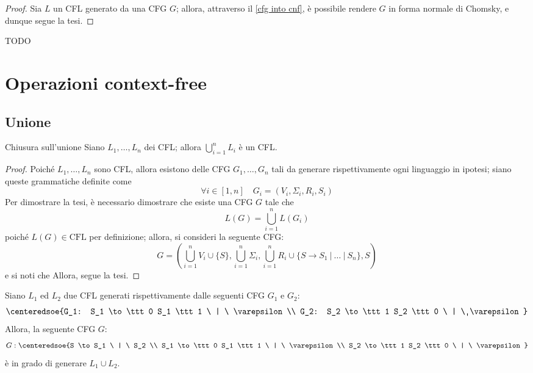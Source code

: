 \documentclass[a4paper, 12pt]{report}
\begin{document}
    \begin{proof}
        Sia $L$ un CFL generato da una CFG $G$; allora, attraverso il \cref{cfg into cnf}, è possibile rendere $G$ in forma normale di Chomsky, e dunque segue la tesi.
    \end{proof}

    \begin{example}
        TODO
    \end{example}

    \section{Operazioni context-free}

    \subsection{Unione}

    \begin{framedprop}{Chiusura sull'unione}
        Siano $L_1, \ldots, L_n$ dei CFL; allora $\displaystyle \bigcup_{i =1}^n{L_i}$ è un CFL.
    \end{framedprop}

    \begin{proof}
        Poiché $L_1, \ldots, L_n$ sono CFL, allora esistono delle CFG $G_1, \ldots, G_n$ tali da generare rispettivamente ogni linguaggio in ipotesi; siano queste grammatiche definite come $$\forall i \in [1, n] \quad G_i = (V_i, \Sigma_i, R_i, S_i)$$ Per dimostrare la tesi, è necessario dimostrare che esiste una CFG $G$ tale che $$L(G) = \bigcup_{i = 1}^n{L(G_i)}$$ poiché $L(G)\in \mathrm{CFL}$ per definizione; allora, si consideri la seguente CFG: $$\displaystyle G = \left( \bigcup_{i = 1}^n{V_i} \cup \{S\}, \bigcup_{i = 1}^n{\Sigma_i}, \bigcup_{i = 1}^n{R_i} \cup \{S \rightarrow S_1 \ | \ \ldots \ | \ S_n\}, S \right)$$ e si noti che  Allora, segue la tesi.
    \end{proof}

    \begin{example}
        Siano $L_1$ ed $L_2$ due CFL generati rispettivamente dalle seguenti CFG $G_1$ e $G_2$: $$\centeredsoe{G_1: S_1 \to \ttt 0 S_1 \ttt 1 \ | \ \varepsilon \\ G_2: S_2 \to \ttt 1 S_2 \ttt 0 \ | \ \varepsilon}$$ Allora, la seguente CFG $G$: $$G: \centeredsoe{S \to S_1 \ | \ S_2 \\ S_1 \to \ttt 0 S_1 \ttt 1 \ | \ \varepsilon \\ S_2 \to \ttt 1 S_2 \ttt 0 \ | \ \varepsilon }$$ è in grado di generare $L_1 \cup L_2$.
    \end{example}
\end{document}
